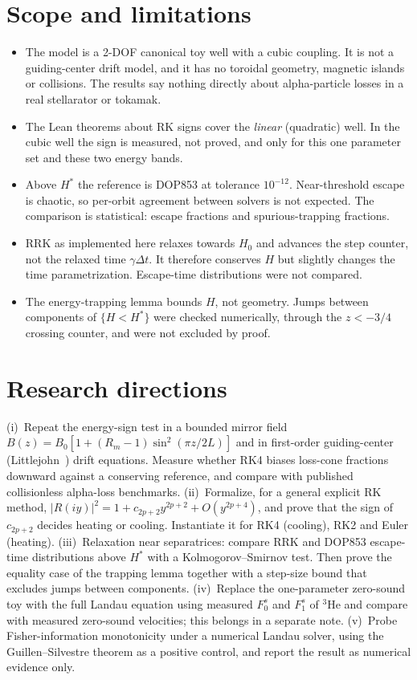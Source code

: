 \documentclass[11pt,a4paper]{article}
\theoremstyle{definition}
\newcommand{\Hs}{H^{*}}
\begin{document}
\section{Scope and limitations}
\label{sec:scope}
\begin{itemize}
  \item The model is a 2-DOF canonical toy well with a cubic coupling. It is not a guiding-center drift model, and it has no toroidal geometry, magnetic islands or collisions. The results say nothing directly about alpha-particle losses in a real stellarator or tokamak.
  \item The Lean theorems about RK signs cover the \emph{linear} (quadratic) well. In the cubic well the sign is measured, not proved, and only for this one parameter set and these two energy bands.
  \item Above $\Hs$ the reference is DOP853 at tolerance $10^{-12}$. Near-threshold escape is chaotic, so per-orbit agreement between solvers is not expected. The comparison is statistical: escape fractions and spurious-trapping fractions.
  \item RRK as implemented here relaxes towards $H_0$ and advances the step counter, not the relaxed time $\gamma\Delta t$. It therefore conserves $H$ but slightly changes the time parametrization. Escape-time distributions were not compared.
  \item The energy-trapping lemma bounds $H$, not geometry. Jumps between components of $\{H<\Hs\}$ were checked numerically, through the $z<-3/4$ crossing counter, and were not excluded by proof.
\end{itemize}

\section{Research directions}
\label{sec:directions}
(i)~Repeat the energy-sign test in a bounded mirror field $B(z)=B_0[1+(R_m-1)\sin^2(\pi z/2L)]$ and in first-order guiding-center (Littlejohn~\cite{Littlejohn1983}) drift equations. Measure whether RK4 biases loss-cone fractions downward against a conserving reference, and compare with published collisionless alpha-loss benchmarks. (ii)~Formalize, for a general explicit RK method, $|R(iy)|^2=1+c_{2p+2}y^{2p+2}+O(y^{2p+4})$, and prove that the sign of $c_{2p+2}$ decides heating or cooling. Instantiate it for RK4 (cooling), RK2 and Euler (heating). (iii)~Relaxation near separatrices: compare RRK and DOP853 escape-time distributions above $\Hs$ with a Kolmogorov--Smirnov test. Then prove the equality case of the trapping lemma together with a step-size bound that excludes jumps between components. (iv)~Replace the one-parameter zero-sound toy with the full Landau equation using measured $F_0^s$ and $F_1^s$ of $^3$He and compare with measured zero-sound velocities; this belongs in a separate note. (v)~Probe Fisher-information monotonicity under a numerical Landau solver, using the Guillen--Silvestre theorem as a positive control, and report the result as numerical evidence only.
\end{document}
